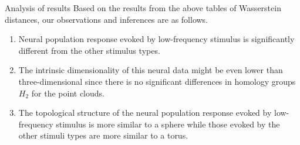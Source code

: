 \documentclass[xcolor={dvipsnames,svgnames}]{beamer}
\begin{document}
\begin{frame}{Analysis of results}
    Based on the results from the above tables of Wasserstein distances, our observations and inferences are as follows.

\begin{enumerate}
    \item Neural population response evoked by low-frequency stimulus is significantly different from the other stimulus types. 
    
    \item The intrinsic dimensionality of this neural data might be even lower than three-dimensional since there is no significant differences in homology groups $H_2$ for the point clouds.
    
    \item The topological structure of the neural population response evoked by low-frequency stimulus is more similar to a sphere while those evoked by the other stimuli types are more similar to a torus. 
    
\end{enumerate}
\end{frame}
\end{document}
